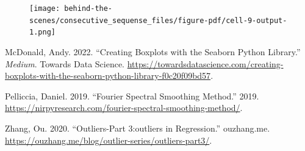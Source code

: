 \documentclass[
  letterpaper,
  DIV=11,
  numbers=noendperiod,
  oneside]{scrreprt}
\newlength{\cslhangindent}
\newlength{\cslentryspacingunit} %
\newenvironment{CSLReferences}[2] %
 {%
  \setlength{\parindent}{0pt}
  \ifodd #1
  \let\oldpar\par
  \def\par{\hangindent=\cslhangindent\oldpar}
  \fi
  \setlength{\parskip}{#2\cslentryspacingunit}
 }%
 {}
\begin{document}
\begin{figure}[H]

{\centering \texttt{[image: behind-the-scenes/consecutive\_sequense\_files/figure-pdf/cell-9-output-1.png]}

}

\end{figure}

\hypertarget{refs}{}
\begin{CSLReferences}{1}{0}
\leavevmode{}%
McDonald, Andy. 2022. {``Creating Boxplots with the Seaborn Python
Library.''} \emph{Medium}. Towards Data Science.
\url{https://towardsdatascience.com/creating-boxplots-with-the-seaborn-python-library-f0c20f09bd57}.

\leavevmode{}%
Pelliccia, Daniel. 2019. {``Fourier Spectral Smoothing Method.''} 2019.
\url{https://nirpyresearch.com/fourier-spectral-smoothing-method/}.

\leavevmode{}%
Zhang, Ou. 2020. {``Outliers-Part 3:outliers in Regression.''}
ouzhang.me.
\url{https://ouzhang.me/blog/outlier-series/outliers-part3/}.

\end{CSLReferences}
\end{document}
